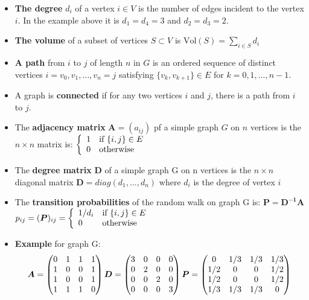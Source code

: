\begin{itemize}
	\item \textbf{The degree} $d_i$ of a vertex $i \in V$ is the number of edges incident to the vertex $i$. In the example above it is $d_1=d_4=3$ and $d_2=d_3=2$.
	\item \textbf{The volume} of a subset of vertices $S \subset V$ is \qquad $\text{Vol}(S)=\sum\limits_{i\in S}^{} d_i$
	\item \textbf{A path} from $i$ to $j$ of length $n$ in $G$ is an ordered sequence of distinct vertices $i=v_0,v_1,\ldots,v_n=j$ satisfying $\{v_k,v_{k+1}\} \in E$ for $k=0,1,\ldots,n-1$.
	\item A graph is \textbf{connected} if for any two vertices $i$ and $j$, there is a path from $i$ to $j$.
	\item The \textbf{adjacency matrix} $\bm{A}=(a_{ij})$ pf a simple graph $G$ on $n$ vertices is the $n \times n$  matrix is: $\left\{ \begin{array}{ll} 1 & \mbox{if } \{i,j\} \in E \\ 0 & \mbox{otherwise } \end{array} \right.$
	\item The \textbf{degree matrix} $\bm{D}$ of a simple graph G on n vertices is the $n \times n$ diagonal matrix $\bm{D}=diag(d_1,\ldots,d_n)$ where $d_i$ is the degree of vertex $i$
	\item The \textbf{transition probabilities} of the random walk on graph G is: $\bm{P}=\bm{D^{-1}A}$ \qquad $p_{ij}=(\boldsymbol{P})_{ij}=\left\{ \begin{array}{ll} 1/d_i & \mbox{if } \{i,j\} \in E \\ 0 & \mbox{otherwise } \end{array} \right.$
	\item \textbf{Example} for graph G:\\
	\begin{equation}
		\boldsymbol{A}=\begin{pmatrix}
			0 & 1 & 1 & 1\\
			1 & 0 & 0 & 1\\
			1 & 0 & 0 & 1\\
			1 & 1 & 1 & 0
		\end{pmatrix}\\
		\boldsymbol{D}=\begin{pmatrix}
			3 & 0 & 0 & 0\\
			0 & 2 & 0 & 0\\
			0 & 0 & 2 & 0\\
			0 & 0 & 0 & 3
		\end{pmatrix}\\
		\boldsymbol{P}=\begin{pmatrix}
			0 & 1/3 & 1/3 & 1/3\\
			1/2 & 0 & 0 & 1/2\\
			1/2 & 0 & 0 & 1/2\\
			1/3 & 1/3 & 1/3 & 0
		\end{pmatrix}\\
	\end{equation}\nonumber
\end{itemize}

